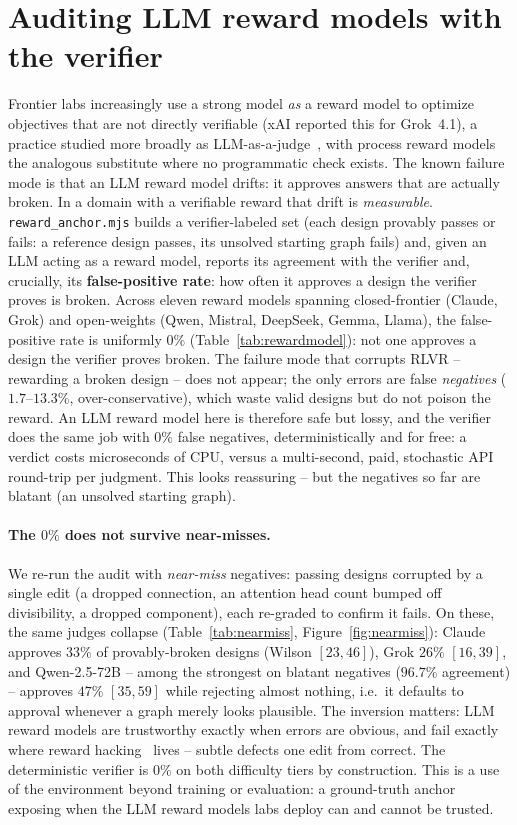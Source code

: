 \documentclass{article}
\begin{document}
\section{Auditing LLM reward models with the verifier}
Frontier labs increasingly use a strong model \emph{as} a reward model to optimize objectives that are not directly verifiable (xAI reported this for Grok~4.1), a practice studied more broadly as LLM-as-a-judge~\cite{llmjudge}, with process reward models~\cite{prm} the analogous substitute where no programmatic check exists. The known failure mode is that an LLM reward model drifts: it approves answers that are actually broken. In a domain with a verifiable reward that drift is \emph{measurable}. \texttt{reward\_anchor.mjs} builds a verifier-labeled set (each design provably passes or fails: a reference design passes, its unsolved starting graph fails) and, given an LLM acting as a reward model, reports its agreement with the verifier and, crucially, its \textbf{false-positive rate}: how often it approves a design the verifier proves is broken. Across eleven reward models spanning closed-frontier (Claude, Grok) and open-weights (Qwen, Mistral, DeepSeek, Gemma, Llama), the false-positive rate is uniformly $0\%$ (Table~\ref{tab:rewardmodel}): not one approves a design the verifier proves broken. The failure mode that corrupts RLVR -- rewarding a broken design -- does not appear; the only errors are false \emph{negatives} ($1.7$--$13.3\%$, over-conservative), which waste valid designs but do not poison the reward. An LLM reward model here is therefore safe but lossy, and the verifier does the same job with $0\%$ false negatives, deterministically and for free: a verdict costs microseconds of CPU, versus a multi-second, paid, stochastic API round-trip per judgment. This looks reassuring -- but the negatives so far are blatant (an unsolved starting graph).

\paragraph{The $0\%$ does not survive near-misses.} We re-run the audit with \emph{near-miss} negatives: passing designs corrupted by a single edit (a dropped connection, an attention head count bumped off divisibility, a dropped component), each re-graded to confirm it fails. On these, the same judges collapse (Table~\ref{tab:nearmiss}, Figure~\ref{fig:nearmiss}): Claude approves $33\%$ of provably-broken designs (Wilson $[23,46]$), Grok $26\%$ $[16,39]$, and Qwen-2.5-72B -- among the strongest on blatant negatives ($96.7\%$ agreement) -- approves $47\%$ $[35,59]$ while rejecting almost nothing, i.e.\ it defaults to approval whenever a graph merely looks plausible. The inversion matters: LLM reward models are trustworthy exactly when errors are obvious, and fail exactly where reward hacking~\cite{rewardgaming} lives -- subtle defects one edit from correct. The deterministic verifier is $0\%$ on both difficulty tiers by construction. This is a use of the environment beyond training or evaluation: a ground-truth anchor exposing when the LLM reward models labs deploy can and cannot be trusted.
\end{document}
